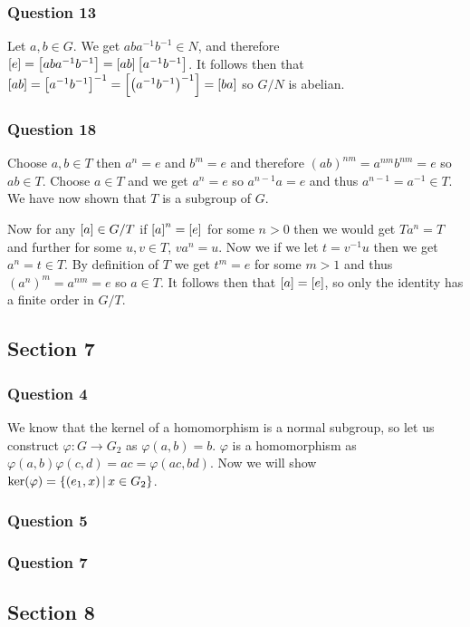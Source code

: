 \documentclass{article}
\begin{document}
\subsubsection{Question 13}
Let $a,b\in G$. We get $aba^{-1}b^{-1}\in N$, and therefore $\left[{e}\right] = \left[{aba^{-1}b^{-1}}\right] = \left[{ab}\right]\left[{a^{-1}b^{-1}}\right]$. It follows then that $\left[{ab}\right] = \left[{a^{-1}b^{-1}}\right]^{-1} = \left[{\left(a^{-1}b^{-1}\right)^{-1}}\right] = \left[{ba}\right]$ so $G / N$ is abelian.

\subsubsection{Question 18}
Choose $a,b\in T$ then $a^n = e$ and $b^m = e$ and therefore $(ab)^{nm} = a^{nm}b^{nm} = e$ so $ab \in T$. Choose $a \in T$ and we get $a^n = e$ so $a^{n-1}a = e$ and thus $a^{n-1} = a^{-1} \in T$. We have now shown that $T$ is a subgroup of $G$.

Now for any $\left[{a}\right]\in G/T$ if $\left[{a}\right]^n = \left[{e}\right]$ for some $n > 0$ then we would get $Ta^n = T$ and further for some $u,v\in T$, $va^n = u$. Now we if we let $t =v^{-1}u$ then we get $a^n = t \in T$. By definition of $T$ we get $t^m = e$ for some $m > 1$ and thus $\left(a^n\right)^m = a^{nm} = e$ so $a \in T$. It follows then that $\left[{a}\right] = \left[{e}\right]$, so only the identity has a finite order in $G/T$.


\subsection{Section 7}
\subsubsection{Question 4}
We know that the kernel of a homomorphism is a normal subgroup, so let us construct $\varphi:G\to G_2$ as $\varphi(a,b) = b$. $\varphi$ is a homomorphism as $\varphi(a,b)\varphi(c,d) = ac = \varphi(ac,bd)$. Now we will show $\ker(\varphi) = \left\{{\left( {e_1} , {x} \right)} \,\middle|\, {x \in G_2}\right\}$.

\subsubsection{Question 5}
\subsubsection{Question 7}

\subsection{Section 8}
\end{document}
